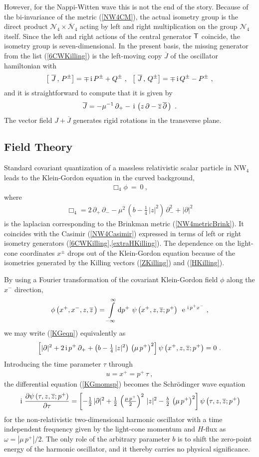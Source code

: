 \documentclass[11pt,a4paper]{article}
\newcommand{\ii}{{\rm i}}
\def\ii{{\,{\rm i}\,}}
\def\dd{{\rm d}}
\def\T{{\sf T}}
\def\e{{\,\rm e}\,}
\newcommand{\beq}{\begin{eqnarray}}
\newcommand{\eeq}{\end{eqnarray}}
\begin{document}
However, for the Nappi-Witten wave this is not the end of the
story. Because of the bi-invariance of the metric (\ref{NW4CM}), the
actual isometry group is the direct product $\mathcal
N_4\times\overline{\mathcal N}_4$ acting by left and right
multiplication on the group $\mathcal N_4$ itself. Since the left
and right actions of the central generator $\T$ coincide, the isometry group is
seven-dimensional. In the present basis, the missing generator from the list
(\ref{6CWKilling}) is the left-moving copy $\overline{J}$ of the
oscillator hamiltonian with
\beq
\left[~\overline{J}\,,\,P^\pm\right]=\mp\ii
P^\pm+ Q{}^{\pm} \ , ~~ \left[~\overline{J}\,,\,
 Q{}^{\pm}\right]=\mp\ii Q{}^{\pm}-P^\pm \ ,
\label{JPpm}\eeq
and it is straightforward to compute that it is given by
\beq
\overline{J}=-\mu^{-1}\,\partial_+-\ii\left(z\,\partial-\overline{z}\,
\overline{\partial}\,\right) \ .
\label{extraHKilling}\eeq
The vector field $J+\overline{J}$ generates rigid rotations in the
transverse plane.

\subsection{Field Theory\label{Dynamics}}

Standard covariant quantization of a massless relativistic scalar
particle in NW$_4$ leads to the Klein-Gordon equation in the curved
background,
\beq
\Box_4\phi~=~0 \ ,
\label{KGeqn}\eeq
where
\beq
\Box_4=2\,\partial_+\,\partial_--\mu^2\,
\left(b-\mbox{$\frac14$}\,|z|^2\right)\,\partial_-^2+|\partial|^2
\label{BoxNW4def}\eeq
is the laplacian corresponding to the Brinkman metric
(\ref{NW4metricBrink}). It coincides with the Casimir
(\ref{NW4Casimir}) expressed in terms of left or right isometry
generators (\ref{6CWKilling},\ref{extraHKilling}). The dependence on
the light-cone coordinates $x^\pm$ drops out of the Klein-Gordon
equation because of the isometries generated by the Killing vectors
(\ref{ZKilling}) and (\ref{HKilling}).

By using a Fourier transformation of the covariant Klein-Gordon field
$\phi$ along the $x^-$ direction,
\beq
\phi\left(x^+,x^-,z,\overline{z}\,\right)=\int\limits_{-\infty}^\infty
\dd p^+~\psi\left(x^+,z,\overline{z};p^+\right)~\e^{\ii p^+x^-} \ ,
\label{KGphiFT}\eeq
we may write (\ref{KGeqn}) equivalently as
\beq
\left[|\partial|^2+2\ii p^+\,\partial_++\left(b-
\mbox{$\frac14$}\,|z|^2\right)\,\left(\mu\,p^+\right)^2\right]\psi\left(x^+,z,
\overline{z};p^+\right)=0 \ .
\label{KGmomsp}\eeq
Introducing the time parameter $\tau$ through
\beq
u=x^+=p^+\,\tau \ ,
\label{utaudef}\eeq
the differential equation (\ref{KGmomsp}) becomes the
Schr\"odinger wave equation
\beq
\ii\,\frac{\partial\psi\left(\tau,z,\overline{z};p^+\right)}{\partial\tau}=
\left[-\mbox{$\frac12$}\,|\partial|^2+\mbox{$\frac12$}\,\left(
\mbox{$\frac{\mu\,p^+}2$}\right)^2\,
|z|^2-\mbox{$\frac b2$}\,\left(\mu\,p^+\right)^2\right]\psi\left(\tau,z,
\overline{z};p^+\right)
\label{SchHO}\eeq
for the non-relativistic two-dimensional harmonic oscillator with a
time independent frequency given by the light-cone momentum and
$H$-flux as $\omega=|\mu\,p^+|/2$. The only role of the arbitrary
parameter $b$ is to shift the zero-point energy of the harmonic
oscillator, and it thereby carries no physical significance.
\end{document}
